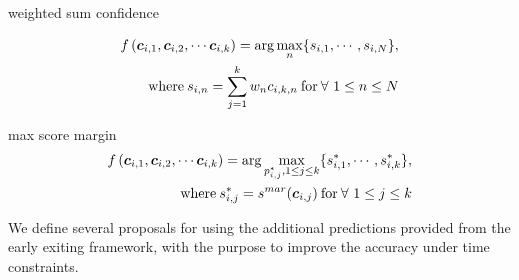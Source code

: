 \begin{enumdescript}
\begin{enumdescript}
				\item[weighted sum confidence]

				\begin{align}
				\begin{split}
					f\left(\bm{c}_{i,1}, \bm{c}_{i,2}, \cdots \bm{c}_{i,k} \right) = \arg \underset{n}{\max} \{s_{i,1}, \cdots, s_{i,N}\},\\ \text{where\:} s_{i,n} = \sum_{j=1}^{k}w_n c_{i,k,n} \text{\:for\:} \forall \ 1\le n \le N
				\end{split}	
				\end{align}
				
				\item[max score margin] 
				\begin{align}
				\begin{split}
				f\left(\bm{c}_{i,1}, \bm{c}_{i,2}, \cdots \bm{c}_{i,k} \right) = \arg \underset{{p_{i,j}^{*}, 1 \le j 
						\le k}}{\max} \{s^{*}_{i,1}, \cdots, s^{*}_{i,k}\},\\ \text{where\:} s^{*}_{i,j} = s^{mar}(\bm{c}_{i,j}) \text{\:for\:} \forall \ 1 \le j \le k
				\end{split}	
				\end{align}
		\end{enumdescript}
	\end{enumdescript}

We define several proposals for using the additional predictions provided from the early exiting framework, with the purpose to improve the accuracy under time constraints.  




